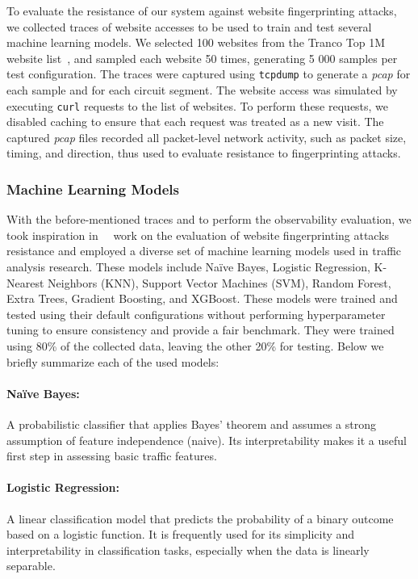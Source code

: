 To evaluate the resistance of our system against website fingerprinting attacks, we collected traces of website accesses to be used to train and test several machine learning models. We selected 100 websites from the Tranco Top 1M website list~\cite{LePochat2019}, and sampled each website 50 times, generating 5 000 samples per test configuration. The traces were captured using \texttt{tcpdump} to generate a \textit{pcap} for each sample and for each circuit segment. The website access was simulated by executing \texttt{curl} requests to the list of websites. To perform these requests, we disabled caching to ensure that each request was treated as a new visit. The captured \textit{pcap} files recorded all packet-level network activity, such as packet size, timing, and direction, thus used to evaluate resistance to fingerprinting attacks. 

\subsubsection{Machine Learning Models}

With the before-mentioned traces and to perform the observability evaluation, we took inspiration in~\citeauthor{MIRACE}~\cite{MIRACE} work on the evaluation of website fingerprinting attacks resistance and employed a diverse set of machine learning models used in traffic analysis research. These models include Naïve Bayes, Logistic Regression, K-Nearest Neighbors (KNN), Support Vector Machines (SVM), Random Forest, Extra Trees, Gradient Boosting, and XGBoost. These models were trained and tested using their default configurations without performing hyperparameter tuning to ensure consistency and provide a fair benchmark. They were trained using 80\% of the collected data, leaving the other 20\% for testing. Below we briefly summarize each of the used models:

\paragraph{Naïve Bayes:} A probabilistic classifier that applies Bayes' theorem and assumes a strong assumption of feature independence (naive). Its interpretability makes it a useful first step in assessing basic traffic features.
\paragraph{Logistic Regression:} A linear classification model that predicts the probability of a binary outcome based on a logistic function. It is frequently used for its simplicity and interpretability in classification tasks, especially when the data is linearly separable.
